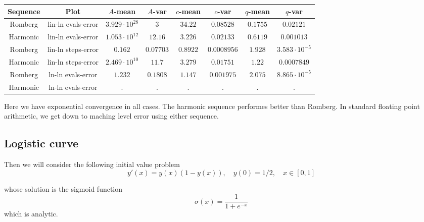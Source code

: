 \begin{table}[H]
    \centering
    \small
    \begin{tabular}{c|c||c|c|c|c|c|c}
Sequence & Plot & \(A\)-mean & \(A\)-var & \(c\)-mean & \(c\)-var & \(q\)-mean & \(q\)-var\\\hline
Romberg & lin-ln evals-error & \(3.929\cdot 10^{28}\) & \(3\) & \(34.22\) & \(0.08528\) & \(0.1755\) & \(0.02121\) \\
Harmonic & lin-ln evals-error & \(1.053\cdot 10^{12}\) & \(12.16\) & \(3.226\) & \(0.02133\) & \(0.6119\) & \(0.001013\) \\
Romberg & lin-ln steps-error & \(0.162\) & \(0.07703\) & \(0.8922\) & \(0.0008956\) & \(1.928\) & \(3.583\cdot 10^{-5}\) \\
Harmonic & lin-ln steps-error & \(2.469\cdot 10^{10}\) & \(11.7\) & \(3.279\) & \(0.01751\) & \(1.22\) & \(0.0007849\) \\
Romberg & ln-ln evals-error & \(1.232\) & \(0.1808\) & \(1.147\) & \(0.001975\) & \(2.075\) & \(8.865\cdot 10^{-5}\) \\
Harmonic & ln-ln evals-error & . & . & . & . & . & . \\
    \end{tabular}
    \label{tab:my_label}
\end{table}

Here we have exponential convergence in all cases. The harmonic sequence performes better than Romberg. In standard floating point arithmetic, we get down to maching level error using either sequence.

\subsection{Logistic curve}

Then we will consider the following initial value problem
\begin{equation}\label{43}
y'(x) = y(x)(1-y(x)),\quad y(0) = 1/2, \quad x\in [0,1]
\end{equation}

whose solution is the sigmoid function
\[
\sigma(x) = \frac{1}{1 + e^{-x}}
\]
which is analytic.

